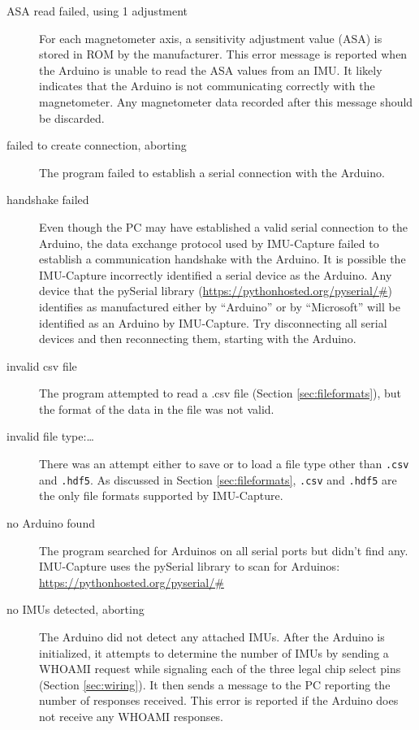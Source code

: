 \documentclass[11pt,letterpaper,article,oneside]{memoir}
\newcommand{\name}{IMU-Capture}
\newcommand{\csv}{\texttt{.csv}}
\newcommand{\hdf}{\texttt{.hdf5}}
\begin{document}
\begin{description}

\item[ASA read failed, using 1 adjustment]
For each magnetometer axis, a sensitivity adjustment value (ASA) is stored in
ROM by the manufacturer.  This error message is reported when the Arduino is
unable to read the ASA values from an IMU.  It likely indicates that the Arduino
is not communicating correctly with the magnetometer.  Any magnetometer data
recorded after this message should be discarded.
\genericFix{}

\item[failed to create connection, aborting]
The program failed to establish a serial connection with the Arduino.
\genericFix{}

\item[handshake failed]
Even though the PC may have established a valid serial connection to the
Arduino, the data exchange protocol used by \name{} failed to establish a
communication handshake with the Arduino.
\genericFix{}
It is possible the \name{} incorrectly identified a serial device as the
Arduino. Any device that the pySerial library
(\url{https://pythonhosted.org/pyserial/#}) identifies as manufactured either by
``Arduino'' or by ``Microsoft'' will be identified as an Arduino by \name{}. Try
disconnecting all serial devices and then reconnecting them, starting with the
Arduino.

\item[invalid csv file]
The program attempted to read a .csv file (Section \ref{sec:fileformats}), but
the format of the data in the file was not valid.

\item[invalid file type:\ldots]
There was an attempt either to save or to load a file type other than
\csv{} and \hdf{}. As discussed in Section \ref{sec:fileformats},
\csv{} and \hdf{} are the only file formats supported by \name.

\item[no Arduino found]
The program searched for Arduinos on all serial ports but didn't find any.
\name{} uses the pySerial library to scan for Arduinos:
\url{https://pythonhosted.org/pyserial/#}

\item[no IMUs detected, aborting]
The Arduino did not detect any attached IMUs.  After the Arduino is initialized,
it attempts to determine the number of IMUs by sending a WHOAMI request while
signaling each of the three legal chip select pins (Section \ref{sec:wiring}).
It then sends a message to the PC reporting the number of responses received. This
error is reported if the Arduino does not receive any WHOAMI responses.
\genericFix{}


\end{description}
\end{document}
